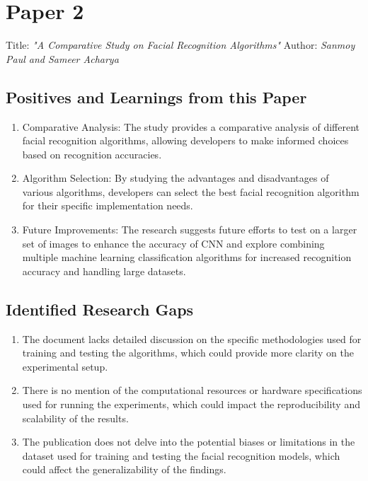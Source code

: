 \documentclass[openany]{report}
\begin{document}
\section{Paper 2}
Title:  \textit{"A Comparative Study on Facial Recognition Algorithms"}
Author:  \textit{Sanmoy Paul and Sameer Acharya}
\cite{8}

\subsection{Positives and Learnings from this Paper}
\begin{enumerate}
    \item Comparative Analysis: The study provides a comparative analysis of different facial recognition algorithms, allowing developers to make informed choices based on recognition accuracies.

    \item Algorithm Selection: By studying the advantages and disadvantages of various algorithms, developers can select the best facial recognition algorithm for their specific implementation needs.

    \item Future Improvements: The research suggests future efforts to test on a larger set of images to enhance the accuracy of CNN and explore combining multiple machine learning classification algorithms for increased recognition accuracy and handling large datasets.
\end{enumerate}
\subsection{Identified Research Gaps}

\begin{enumerate}
    \item The document lacks detailed discussion on the specific methodologies used for training and testing the algorithms, which could provide more clarity on the experimental setup.
    \item There is no mention of the computational resources or hardware specifications used for running the experiments, which could impact the reproducibility and scalability of the results.
    \item The publication does not delve into the potential biases or limitations in the dataset used for training and testing the facial recognition models, which could affect the generalizability of the findings.
\end{enumerate}
\end{document}
